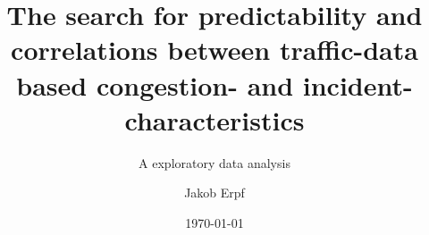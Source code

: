 \titlehead{\centering Technical Universtity of Munich}
\subject{Master's Thesis}
\title{The search for predictability and correlations between traffic-data based congestion- and incident-characteristics}
\subtitle{A exploratory data analysis}
\author{Jakob Erpf}
\date{\today}
\publishers{...}
\maketitle
